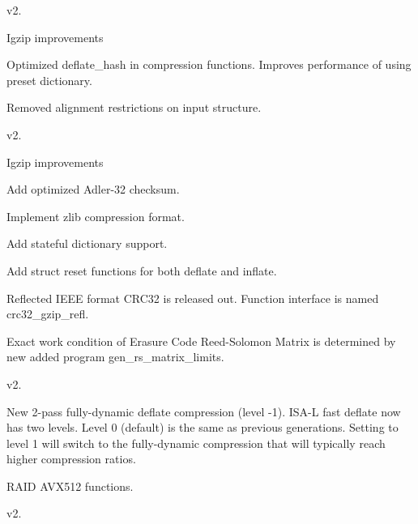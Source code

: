 v2.


\begin{DoxyItemize}
\item Igzip improvements
\begin{DoxyItemize}
\item Optimized deflate\-\_\-hash in compression functions. Improves performance of using preset dictionary.
\item Removed alignment restrictions on input structure.
\end{DoxyItemize}
\end{DoxyItemize}

v2.


\begin{DoxyItemize}
\item Igzip improvements
\begin{DoxyItemize}
\item Add optimized Adler-\/32 checksum.
\item Implement zlib compression format.
\item Add stateful dictionary support.
\item Add struct reset functions for both deflate and inflate.
\end{DoxyItemize}
\item Reflected I\-E\-E\-E format C\-R\-C32 is released out. Function interface is named crc32\-\_\-gzip\-\_\-refl.
\item Exact work condition of Erasure Code Reed-\/\-Solomon Matrix is determined by new added program gen\-\_\-rs\-\_\-matrix\-\_\-limits.
\end{DoxyItemize}

v2.


\begin{DoxyItemize}
\item New 2-\/pass fully-\/dynamic deflate compression (level -\/1). I\-S\-A-\/\-L fast deflate now has two levels. Level 0 (default) is the same as previous generations. Setting to level 1 will switch to the fully-\/dynamic compression that will typically reach higher compression ratios.
\item R\-A\-I\-D A\-V\-X512 functions.
\end{DoxyItemize}

v2.



